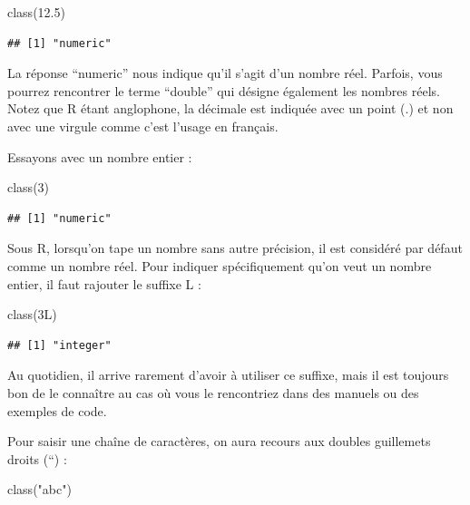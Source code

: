 \documentclass[
]{book}
\newenvironment{Shaded}{\begin{snugshade}}{\end{snugshade}}
\newcommand{\DecValTok}[1]{\textcolor[rgb]{0.00,0.00,0.81}{#1}}
\newcommand{\FloatTok}[1]{\textcolor[rgb]{0.00,0.00,0.81}{#1}}
\newcommand{\FunctionTok}[1]{\textcolor[rgb]{0.00,0.00,0.00}{#1}}
\newcommand{\NormalTok}[1]{#1}
\newcommand{\StringTok}[1]{\textcolor[rgb]{0.31,0.60,0.02}{#1}}
\begin{document}
\begin{Shaded}
\begin{Highlighting}[]
\FunctionTok{class}\NormalTok{(}\FloatTok{12.5}\NormalTok{)}
\end{Highlighting}
\end{Shaded}

\begin{verbatim}
## [1] "numeric"
\end{verbatim}

La réponse ``numeric'' nous indique qu'il s'agit d'un nombre réel. Parfois, vous pourrez rencontrer le terme ``double'' qui désigne également les nombres réels. Notez que R étant anglophone, la décimale est indiquée avec un point (.) et non avec une virgule comme c'est l'usage en français.

Essayons avec un nombre entier :

\begin{Shaded}
\begin{Highlighting}[]
\FunctionTok{class}\NormalTok{(}\DecValTok{3}\NormalTok{)}
\end{Highlighting}
\end{Shaded}

\begin{verbatim}
## [1] "numeric"
\end{verbatim}

Sous R, lorsqu'on tape un nombre sans autre précision, il est considéré par défaut comme un nombre réel. Pour indiquer spécifiquement qu'on veut un nombre entier, il faut rajouter le suffixe L :

\begin{Shaded}
\begin{Highlighting}[]
\FunctionTok{class}\NormalTok{(3L)}
\end{Highlighting}
\end{Shaded}

\begin{verbatim}
## [1] "integer"
\end{verbatim}

Au quotidien, il arrive rarement d'avoir à utiliser ce suffixe, mais il est toujours bon de le connaître au cas où vous le rencontriez dans des manuels ou des exemples de code.

Pour saisir une chaîne de caractères, on aura recours aux doubles guillemets droits (``) :

\begin{Shaded}
\begin{Highlighting}[]
\FunctionTok{class}\NormalTok{(}\StringTok{"abc"}\NormalTok{)}
\end{Highlighting}
\end{Shaded}
\end{document}
